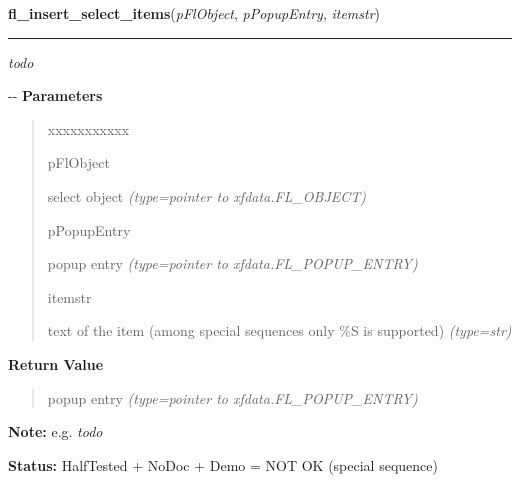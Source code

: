 \hspace{.8\funcindent}\begin{boxedminipage}{\funcwidth}

    \raggedright \textbf{fl\_insert\_select\_items}(\textit{pFlObject}, \textit{pPopupEntry}, \textit{itemstr})

    \vspace{-1.5ex}

    \rule{\textwidth}{0.5\fboxrule}
\setlength{\parskip}{2ex}

\emph{todo}

-{}-
\setlength{\parskip}{1ex}
      \textbf{Parameters}
      \vspace{-1ex}

      \begin{quote}
        \begin{Ventry}{xxxxxxxxxxx}

          \item[pFlObject]


select object
            {\it (type=pointer to xfdata.FL\_OBJECT)}

          \item[pPopupEntry]


popup entry
            {\it (type=pointer to xfdata.FL\_POPUP\_ENTRY)}

          \item[itemstr]


text of the item (among special sequences only \%S is supported)
            {\it (type=str)}

        \end{Ventry}

      \end{quote}

      \textbf{Return Value}
    \vspace{-1ex}

      \begin{quote}

popup entry
      {\it (type=pointer to xfdata.FL\_POPUP\_ENTRY)}

      \end{quote}

\textbf{Note:} 
e.g. \emph{todo}


\textbf{Status:} 
HalfTested + NoDoc + Demo = NOT OK (special sequence)


    \end{boxedminipage}

    \label{xformslib:flselect:fl_replace_select_item}

